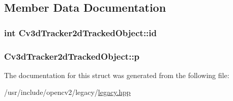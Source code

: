 \subsection{Member Data Documentation}
\hypertarget{structCv3dTracker2dTrackedObject_ae8506973231f03c325859c9d3e6e11fe}{
\subsubsection[{id}]{\setlength{\rightskip}{0pt plus 5cm}int Cv3d\-Tracker2d\-Tracked\-Object\-::id}}\label{structCv3dTracker2dTrackedObject_ae8506973231f03c325859c9d3e6e11fe}
\hypertarget{structCv3dTracker2dTrackedObject_a6547dda87ebd39274bdd54869e504fd3}{
\subsubsection[{p}]{ Cv3d\-Tracker2d\-Tracked\-Object\-::p}}\label{structCv3dTracker2dTrackedObject_a6547dda87ebd39274bdd54869e504fd3}


The documentation for this struct was generated from the following file\-:\begin{DoxyCompactItemize}
\item 
/usr/include/opencv2/legacy/\hyperlink{legacy_8hpp}{legacy.\-hpp}\end{DoxyCompactItemize}
